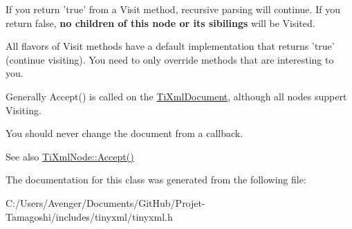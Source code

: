 If you return 'true' from a Visit method, recursive parsing will continue. If you return false, {\bfseries no children of this node or its sibilings} will be Visited.

All flavors of Visit methods have a default implementation that returns 'true' (continue visiting). You need to only override methods that are interesting to you.

Generally Accept() is called on the \hyperlink{class_ti_xml_document}{Ti\+Xml\+Document}, although all nodes suppert Visiting.

You should never change the document from a callback.

\begin{DoxySeeAlso}{See also}
\hyperlink{class_ti_xml_node_acc0f88b7462c6cb73809d410a4f5bb86}{Ti\+Xml\+Node\+::\+Accept()} 
\end{DoxySeeAlso}


The documentation for this class was generated from the following file\+:\begin{DoxyCompactItemize}
\item 
C\+:/\+Users/\+Avenger/\+Documents/\+Git\+Hub/\+Projet-\/\+Tamagoshi/includes/tinyxml/tinyxml.\+h\end{DoxyCompactItemize}
